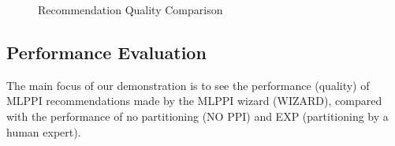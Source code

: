 \documentclass[paper]{ieice}
\begin{document}
\begin{figure}[t]
\vspace{-.2in}
\centering
{}
\vspace{-0.1in}
\caption{Recommendation Quality Comparison\label{fig:recomm_qual}}
\vspace{-.1in}
\end{figure}

\subsection{Performance Evaluation}

The main focus of our demonstration is to see the performance (quality) 
of MLPPI \hbox{recommendations} made by the MLPPI wizard (WIZARD), 
compared with the performance of no partitioning (NO PPI) and EXP (partitioning 
by a human expert). 
\end{document}
